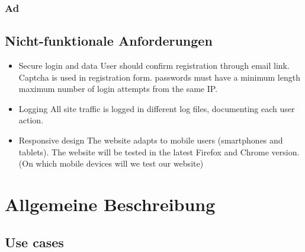 \documentclass[a4wide]{article}
\begin{document}
\subsubsection{Ad}

\subsection{Nicht-funktionale Anforderungen}
\begin{itemize}
\item Secure login and data
    User should confirm registration through email link.
    Captcha is used in registration form.
    passwords must have a minimum length 
    maximum number of  login attempts from the same IP. 
\item Logging
    All site traffic is logged in different log files, documenting each user action.
\item Responsive design
    The website adapts to mobile users (smartphones and tablets).
    The website will be tested in the latest Firefox and Chrome version.
    (On which mobile devices will we test our website)
\end{itemize}
\section{Allgemeine Beschreibung}
\subsection{Use cases}
\newcommand{\usecase}[2][(Name)]{
	\subsubsection{#1}
	\begin{description}
		#2
	\end{description}
}
\end{document}
